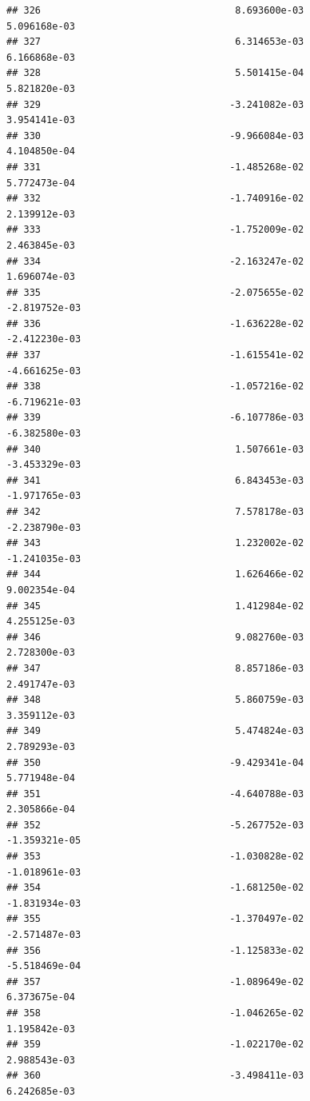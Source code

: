 \documentclass[
]{article}
\begin{document}
\begin{verbatim}
## 326                                  8.693600e-03           5.096168e-03
## 327                                  6.314653e-03           6.166868e-03
## 328                                  5.501415e-04           5.821820e-03
## 329                                 -3.241082e-03           3.954141e-03
## 330                                 -9.966084e-03           4.104850e-04
## 331                                 -1.485268e-02           5.772473e-04
## 332                                 -1.740916e-02           2.139912e-03
## 333                                 -1.752009e-02           2.463845e-03
## 334                                 -2.163247e-02           1.696074e-03
## 335                                 -2.075655e-02          -2.819752e-03
## 336                                 -1.636228e-02          -2.412230e-03
## 337                                 -1.615541e-02          -4.661625e-03
## 338                                 -1.057216e-02          -6.719621e-03
## 339                                 -6.107786e-03          -6.382580e-03
## 340                                  1.507661e-03          -3.453329e-03
## 341                                  6.843453e-03          -1.971765e-03
## 342                                  7.578178e-03          -2.238790e-03
## 343                                  1.232002e-02          -1.241035e-03
## 344                                  1.626466e-02           9.002354e-04
## 345                                  1.412984e-02           4.255125e-03
## 346                                  9.082760e-03           2.728300e-03
## 347                                  8.857186e-03           2.491747e-03
## 348                                  5.860759e-03           3.359112e-03
## 349                                  5.474824e-03           2.789293e-03
## 350                                 -9.429341e-04           5.771948e-04
## 351                                 -4.640788e-03           2.305866e-04
## 352                                 -5.267752e-03          -1.359321e-05
## 353                                 -1.030828e-02          -1.018961e-03
## 354                                 -1.681250e-02          -1.831934e-03
## 355                                 -1.370497e-02          -2.571487e-03
## 356                                 -1.125833e-02          -5.518469e-04
## 357                                 -1.089649e-02           6.373675e-04
## 358                                 -1.046265e-02           1.195842e-03
## 359                                 -1.022170e-02           2.988543e-03
## 360                                 -3.498411e-03           6.242685e-03

\end{verbatim}
\end{document}
